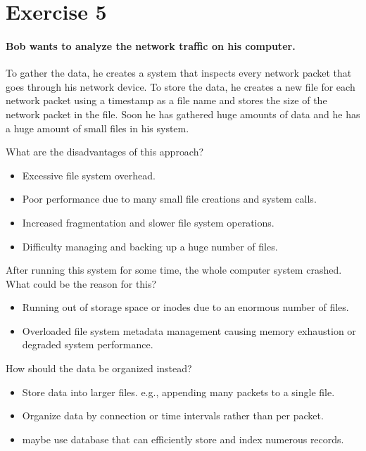\documentclass{article}
\newcommand{\exercise}[1]{
    \section*{Exercise #1}
    \markboth{Exercise #1}{}
}
\begin{document}
\newpage
\exercise{5}

\paragraph{Bob wants to analyze the network traffic on his computer.} To gather
the data, he creates a system that inspects every network packet that goes through
his network device. To store the data, he creates a new file for each network packet
using a timestamp as a file name and stores the size of the network packet in the file.
Soon he has gathered huge amounts of data and he has a huge amount of small files in
his system.

\begin{enumerate}[label=\textbf{\makebox[1cm][l]{\Huge\text{(\stylishfont\alph*)}}}, leftmargin=!, labelindent=0pt]
    \item What are the disadvantages of this approach?
      \begin{itemize}
        \item Excessive file system overhead.
        \item Poor performance due to many small file creations and system calls.
        \item Increased fragmentation and slower file system operations.
        \item Difficulty managing and backing up a huge number of files.
      \end{itemize}

    \item After running this system for some time, the whole computer system crashed.
    What could be the reason for this?
    \begin{itemize}
        \item Running out of storage space or inodes due to an enormous number of files.
        \item Overloaded file system metadata management causing memory exhaustion or
        degraded system performance.
      \end{itemize}
    \item How should the data be organized instead?
      \begin{itemize}
        \item Store data into larger files. e.g., appending many packets  to a single file.
        \item Organize data by connection or time intervals rather than per packet.
        \item maybe use database that can efficiently store and index numerous records.
      \end{itemize}
\end{enumerate}

\newpage
\printbibliography
\end{document}
